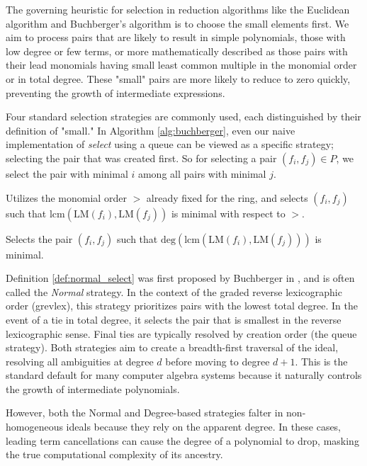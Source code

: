 The governing heuristic for selection in reduction algorithms like the Euclidean algorithm and Buchberger's algorithm is to choose the small elements first. We aim to process pairs that are likely to result in simple polynomials, those with low degree or few terms, or more mathematically described as those pairs with their lead monomials having small least common multiple in the monomial order or in total degree. These "small" pairs are more likely to reduce to zero quickly, preventing the growth of intermediate expressions.

Four standard selection strategies are commonly used, each distinguished by their definition of "small." In Algorithm \ref{alg:buchberger}, even our naive implementation of \textit{select} using a queue can be viewed as a specific strategy; selecting the pair that was created first. So for selecting a pair $(f_i, f_j) \in P$, we select the pair with minimal $i$ among all pairs with minimal $j$. 

\begin{definition}
    \label{def:normal_select}
    Utilizes the monomial order $>$ already fixed for the ring, and selects $(f_i, f_j)$ such that $\text{lcm}(\text{LM}(f_i), \text{LM}(f_j))$ is minimal with respect to $>$.
\end{definition}

\begin{definition}
    \label{def:degree_select}
    Selects the pair $(f_i, f_j)$ such that $\text{deg}(\text{lcm}(\text{LM}(f_i), \text{LM}(f_j)))$ is minimal. 
\end{definition}

Definition \ref{def:normal_select} was first proposed by Buchberger in \cite{Buchberger1965_algorithmEnglish}, and is often called the \textit{Normal} strategy. In the context of the graded reverse lexicographic order (grevlex), this strategy prioritizes pairs with the lowest total degree. In the event of a tie in total degree, it selects the pair that is smallest in the reverse lexicographic sense. Final ties are typically resolved by creation order (the queue strategy). Both strategies aim to create a breadth-first traversal of the ideal, resolving all ambiguities at degree $d$ before moving to degree $d+1$. This is the standard default for many computer algebra systems because it naturally controls the growth of intermediate polynomials.

However, both the Normal and Degree-based strategies falter in non-homogeneous ideals because they rely on the apparent degree. In these cases, leading term cancellations can cause the degree of a polynomial to drop, masking the true computational complexity of its ancestry.

